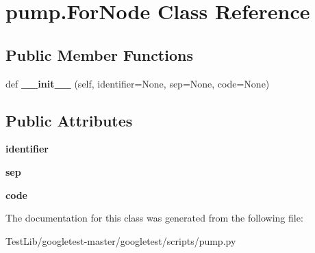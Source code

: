 \hypertarget{classpump_1_1ForNode}{}\section{pump.\+For\+Node Class Reference}
\label{classpump_1_1ForNode}
\subsection*{Public Member Functions}
\begin{DoxyCompactItemize}
\item 
\mbox{\label{classpump_1_1ForNode_a9cf60468cacdb06acce35074ab2a2b55}} 
def {\bfseries \+\_\+\+\_\+init\+\_\+\+\_\+} (self, identifier=None, sep=None, code=None)
\end{DoxyCompactItemize}
\subsection*{Public Attributes}
\begin{DoxyCompactItemize}
\item 
\mbox{\label{classpump_1_1ForNode_a2444199e135e43696b3a006bd0d38982}} 
{\bfseries identifier}
\item 
\mbox{\label{classpump_1_1ForNode_a06b493278b3c1ad53363a2bcc3b8efb3}} 
{\bfseries sep}
\item 
\mbox{\label{classpump_1_1ForNode_afdb5f4f2a3bc772bbc6ea777dfde898e}} 
{\bfseries code}
\end{DoxyCompactItemize}


The documentation for this class was generated from the following file\+:\begin{DoxyCompactItemize}
\item 
Test\+Lib/googletest-\/master/googletest/scripts/pump.\+py\end{DoxyCompactItemize}
